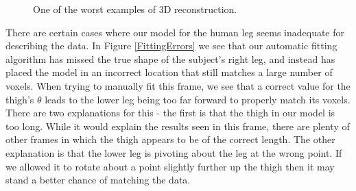 \begin{figure}[bp]
	\centering
	\quad
	
	\caption{One of the worst examples of 3D reconstruction.}
	\label{BadData}
\end{figure}

There are certain cases where our model for the human leg seems inadequate for describing the data.
In Figure \ref{FittingErrors} we see that our automatic fitting algorithm has missed the true shape of the subject's right leg, and instead has placed the model in an incorrect location that still matches a large number of voxels.
When trying to manually fit this frame, we see that a correct value for the thigh's $\theta$ leads to the lower leg being too far forward to properly match its voxels.
There are two explanations for this - the first is that the thigh in our model is too long.
While it would explain the results seen in this frame, there are plenty of other frames in which the thigh appears to be of the correct length.
The other explanation is that the lower leg is pivoting about the leg at the wrong point.
If we allowed it to rotate about a point slightly further up the thigh then it may stand a better chance of matching the data.


